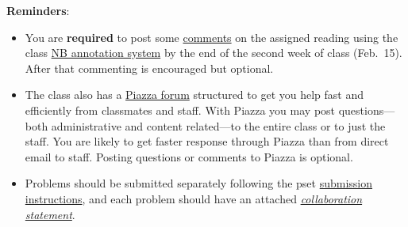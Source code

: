 \documentclass[handout]{mcs}
\begin{document}
\renewcommand{\reading}{
Part~\bref{part:proofs}{. \emph{Proofs:
      Introduction}}; Chapter~\bref{proofs_chap}{.\ \emph{What is a
      Proof?}}; Chapter~\bref{well_ordering_chap}{.\ \emph{The Well
      Ordering Principle}}.  These
  assigned readings do \textbf{not} include the Problem sections.  (Many
  of the problems in the text will appear as class or homework problems.)}


\medskip

\textbf{Reminders}:
\begin{itemize}
\item 
  You are \textbf{required} to post some
  \href{http://courses.csail.mit.edu/6.042/spring13/courseinfo#comments}{comments}
  on the assigned reading using the class
  \href{http://nb.csail.mit.edu}{NB annotation system} by the end of
  the second week of class (Feb.\ 15).  After that commenting is
  encouraged but optional.

\item The class also has a
  \href{http://piazza.com/mit/spring2013/6042j18062j/home}{Piazza
    forum} structured to get you help fast and efficiently from
  classmates and staff.  With Piazza you may post questions---both
  administrative and content related---to the entire class or to just
  the staff.  You are likely to get faster response through Piazza
  than from direct email to staff.  Posting questions or comments to
  Piazza is optional.

\item Problems should be submitted separately following the pset
  \href{http://courses.csail.mit.edu/6.042/spring13/submission.shtml}
       {submission instructions}, and each problem should have an attached
  \href{http://courses.csail.mit.edu/6.042/spring13/submission_template.pdf}
       {\emph{collaboration statement}}.

 \end{itemize}











\iffalse
\begin{center}
\large \textbf{Optional:}
\end{center}

\pinput{PS_faster_adder_logic}
\fi

\end{document}
